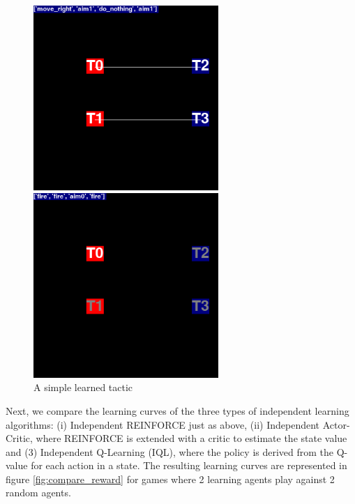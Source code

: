 \begin{figure}
\begin{minipage}{.5\textwidth}
  \includegraphics[width=7cm]{images/animation01/screenshot0-3.png}
\end{minipage}%
\begin{minipage}{.5\textwidth}
  \centering
  \includegraphics[width=7cm]{images/animation01/screenshot0-4.png}
\end{minipage}
\caption{A simple learned tactic}
\label{fig:simple_tactic01}
\end{figure}

Next, we compare the learning curves of the three types of independent learning algorithms: (i) Independent REINFORCE just as above, (ii) Independent Actor-Critic, where REINFORCE is extended with a critic to estimate the state value and (3) Independent Q-Learning (IQL), where the policy is derived from the Q-value for each action in a state. The resulting learning curves are represented in figure \ref{fig:compare_reward} for games where 2 learning agents play against 2 random agents.


